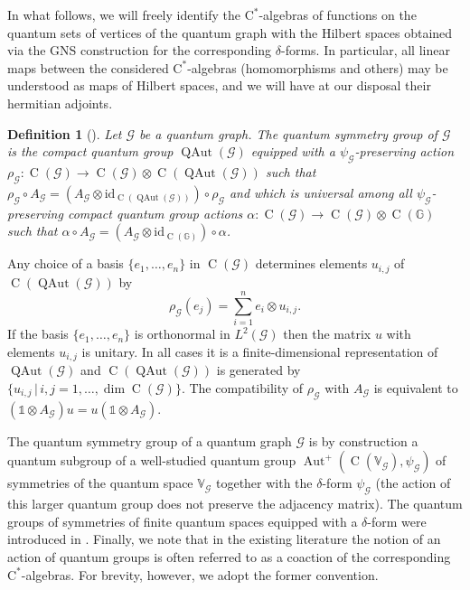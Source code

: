 \documentclass[11pt,reqno]{amsart}
\newtheorem{definition}[proposition]{Definition}
\newcommand{\cst}{\ensuremath{\mathrm{C}^*}}
\newcommand{\id}{\mathrm{id}}
\newcommand{\I}{\mathds{1}}
\newcommand{\comp}{\circ}
\newcommand{\tens}{\otimes}
\DeclareMathOperator{\Aut}{Aut}
\DeclareMathOperator{\QAut}{QAut}
\DeclareMathOperator{\C}{C}
\begin{document}
In what follows, we will freely identify the \cst-algebras of functions on the quantum sets of vertices of the quantum graph with the Hilbert spaces obtained via the GNS construction for the corresponding $\delta$-forms. In particular, all linear maps between the considered \cst-algebras (homomorphisms and others) may be understood as maps of Hilbert spaces, and we will have at our disposal their hermitian adjoints.

\begin{definition}[{\cite[Definition 6.3]{BEV}}]
Let $\mathcal{G}$ be a quantum graph. The \emph{quantum symmetry group} of $\mathcal{G}$ is the compact quantum group $\QAut(\mathcal{G})$ equipped with a $\psi_{\scriptscriptstyle\mathcal{G}}$-preserving action $\rho_{\scriptscriptstyle\mathcal{G}}\colon\C(\mathcal{G})\to\C(\mathcal{G})\tens\C(\QAut(\mathcal{G}))$ such that $\rho_{\scriptscriptstyle\mathcal{G}}\comp{A_{\scriptscriptstyle\mathcal{G}}}=(A_{\scriptscriptstyle\mathcal{G}}\tens\id_{\C(\QAut(\mathcal{G}))})\comp\rho_{\scriptscriptstyle\mathcal{G}}$ and which is universal among all $\psi_{\scriptscriptstyle\mathcal{G}}$-preserving compact quantum group actions $\alpha\colon\C(\mathcal{G})\to\C(\mathcal{G})\tens\C(\mathbb{G})$ such that $\alpha\comp A_{\scriptscriptstyle\mathcal{G}} = (A_{\scriptscriptstyle\mathcal{G}}\tens\id_{\C(\mathbb{G})})\comp\alpha$.
\end{definition}

Any choice of a basis $\{e_1,\dotsc,e_n\}$ in $\C(\mathcal{G})$ determines elements $u_{i,j}$ of $\C(\QAut(\mathcal{G}))$ by
\[
\rho_{\scriptscriptstyle\mathcal{G}}(e_j)=\sum_{i=1}^n e_i\tens u_{i,j}.
\]
If the basis $\{e_1,\dotsc,e_n\}$ is orthonormal in $L^2(\mathcal{G})$ then the matrix $u$ with elements $u_{i,j}$ is unitary. In all cases it is a finite-dimensional representation of $\QAut(\mathcal{G})$ and $\C(\QAut(\mathcal{G}))$ is generated by $\{u_{i,j}\,|\,i,j=1,\dotsc,\dim{\C(\mathcal{G})}\}$. The compatibility of $\rho_{\scriptscriptstyle\mathcal{G}}$ with $A_{\scriptscriptstyle\mathcal{G}}$ is equivalent to $(\I\tens{A_{\scriptscriptstyle\mathcal{G}}})u=u(\I\tens{A_{\scriptscriptstyle\mathcal{G}}})$.

The quantum symmetry group of a quantum graph $\mathcal{G}$ is by construction a quantum subgroup of a well-studied quantum group $\Aut^+(\C(\mathbb{V}_{\scriptscriptstyle\mathcal{G}}),\psi_{\scriptscriptstyle\mathcal{G}})$ of symmetries of the quantum space $\mathbb{V}_{\scriptscriptstyle\mathcal{G}}$ together with the $\delta$-form $\psi_{\scriptscriptstyle\mathcal{G}}$ (the action of this larger quantum group does not preserve the adjacency matrix). The quantum groups of symmetries of finite quantum spaces equipped with a $\delta$-form were introduced in \cite{Banica02}. Finally, we note that in the existing literature the notion of an action of quantum groups is often referred to as a coaction of the corresponding \cst-algebras. For brevity, however, we adopt the former convention.
\end{document}

